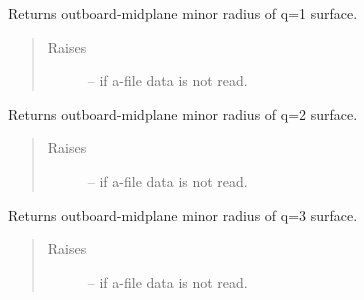 \documentclass[letterpaper,10pt,english]{sphinxmanual}
\begin{document}
\begin{fulllineitems}
\begin{fulllineitems}
\label{eqtools:eqtools.eqdskreader.EqdskReader.getQ1Surf}
Returns outboard-midplane minor radius of q=1 surface.
\begin{quote}\begin{description}
\item[{Raises }] \leavevmode
{} -- 
if a-file data is not read.

\end{description}\end{quote}

\end{fulllineitems}


\begin{fulllineitems}
\label{eqtools:eqtools.eqdskreader.EqdskReader.getQ2Surf}
Returns outboard-midplane minor radius of q=2 surface.
\begin{quote}\begin{description}
\item[{Raises }] \leavevmode
{} -- 
if a-file data is not read.

\end{description}\end{quote}

\end{fulllineitems}


\begin{fulllineitems}
\label{eqtools:eqtools.eqdskreader.EqdskReader.getQ3Surf}
Returns outboard-midplane minor radius of q=3 surface.
\begin{quote}\begin{description}
\item[{Raises }] \leavevmode
{} -- 
if a-file data is not read.

\end{description}\end{quote}

\end{fulllineitems}



\end{fulllineitems}
\end{document}
